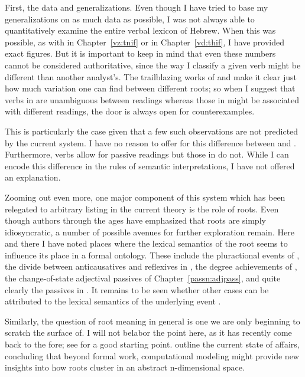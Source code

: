 First, the data and generalizations. Even though I have tried to base my generalizations on as much data as possible, I was not always able to quantitatively examine the entire verbal lexicon of Hebrew. When this was possible, as with {\tnif} in Chapter~\ref{vz:tnif} or {\thif} in Chapter~\ref{vd:thif}, I have provided exact figures. But it is important to keep in mind that even these numbers cannot be considered authoritative, since the way I classify a given verb might be different than another analyst's. The trailblazing works of \cite{doron03} and \cite{arad05} make it clear just how much variation one can find between different roots; so when I suggest that verbs in {\thit} are unambiguous between readings whereas those in {\tnif} might be associated with different readings, the door is always open for counterexamples.

This is particularly the case given that a few such observations are not predicted by the current system. I have no reason to offer for this difference between {\thit} and {\tnif}. Furthermore, {\tnif} verbs allow for passive readings but those in {\thit} do not. While I can encode this difference in the rules of semantic interpretations, I have not offered an explanation.

Zooming out even more, one major component of this system which has been relegated to arbitrary listing in the current theory is the role of roots. Even though authors through the ages have emphasized that roots are simply idiosyncratic, a number of possible avenues for further exploration remain. Here and there I have noted places where the lexical semantics of the root seems to influence its place in a formal ontology. These include the pluractional events of {\tpie}, the divide between anticausatives and reflexives in {\thit}, the degree achievements of {\thif}, the change-of-state adjectival passives of Chapter~\ref{passn:adjpass}, and quite clearly the passives in {\tnif}. It remains to be seen whether other cases can be attributed to the lexical semantics of the underlying event  \citep[114]{kastner16phd}.

Similarly, the question of root meaning in general is one we are only beginning to scratch the surface of. I will not belabor the point here, as it has recently come back to the fore; see \cite{harley14thlia} for a good starting point.
\cite{kastnertucker19cup} outline the current state of affairs, concluding that beyond formal work, computational modeling might provide new insights into how roots cluster in an abstract n-dimensional space.

